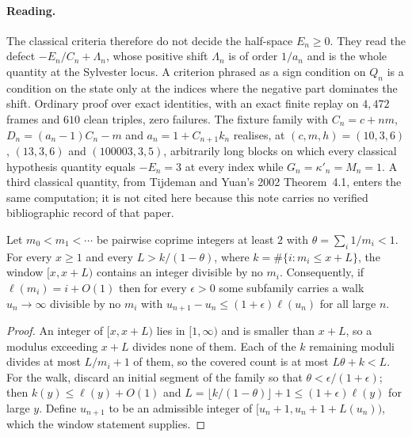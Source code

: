 \documentclass[11pt]{article}
\begin{document}
\paragraph{Reading.}
The classical criteria therefore do not decide the half-space $E_n\ge0$.  They
read the defect $-E_n/C_n+\Lambda_n$, whose positive shift $\Lambda_n$ is of
order $1/a_n$ and is the whole quantity at the Sylvester locus.  A criterion
phrased as a sign condition on $Q_n$ is a condition on the state only at the
indices where the negative part dominates the shift.  Ordinary proof over exact
identities, with an exact finite replay on $4{,}472$ frames and $610$ clean
triples, zero failures.  The fixture family with $C_n=c+nm$,
$D_n=(a_n-1)C_n-m$ and $a_n=1+C_{n+1}k_n$ realises, at $(c,m,h)=(10,3,6)$,
$(13,3,6)$ and $(100003,3,5)$, arbitrarily long blocks on which every classical
hypothesis quantity equals $-E_n=3$ at every index while
$G_n=\kappa'_n=M_n=1$.  A third classical quantity, from Tijdeman and Yuan's
2002 Theorem~4.1, enters the same computation; it is not cited here because
this note carries no verified bibliographic record of that paper.

\begin{proposition}\label{long243:res:coprimalitycap}
Let $m_0<m_1<\cdots$ be pairwise coprime integers at least $2$ with
$\theta=\sum_i1/m_i<1$.  For every $x\ge1$ and every $L>k/(1-\theta)$, where
$k=\#\{i:m_i\le x+L\}$, the window $[x,x+L)$ contains an integer divisible by
no $m_i$.  Consequently, if $\ell(m_i)=i+O(1)$ then for every $\epsilon>0$ some
subfamily carries a walk $u_n\to\infty$ divisible by no $m_i$ with
$u_{n+1}-u_n\le(1+\epsilon)\ell(u_n)$ for all large $n$.
\end{proposition}

\begin{proof}
An integer of $[x,x+L)$ lies in $[1,\infty)$ and is smaller than $x+L$, so a
modulus exceeding $x+L$ divides none of them.  Each of the $k$ remaining
moduli divides at most $L/m_i+1$ of them, so the covered count is at most
$L\theta+k<L$.  For the walk, discard an initial segment of the family so that
$\theta<\epsilon/(1+\epsilon)$; then $k(y)\le\ell(y)+O(1)$ and
$L=\lfloor k/(1-\theta)\rfloor+1\le(1+\epsilon)\ell(y)$ for large $y$.  Define
$u_{n+1}$ to be an admissible integer of $[u_n+1,u_n+1+L(u_n))$, which the
window statement supplies.
\end{proof}
\end{document}
